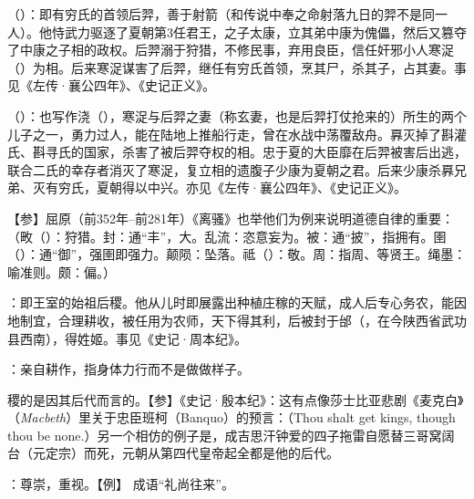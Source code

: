 {
\item {}（）：即有穷氏的首领后羿，善于射箭（和传说中奉之命射落九日的羿不是同一人）。他恃武力驱逐了夏朝第3任君王，之子太康，立其弟中康为傀儡，然后又篡夺了中康之子相的政权。后羿溺于狩猎，不修民事，弃用良臣，信任奸邪小人寒浞（）为相。后来寒浞谋害了后羿，继任有穷氏首领，烹其尸，杀其子，占其妻。事见《左传·襄公四年》、《史记正义》。
\item {}（）：也写作浇（），寒浞与后羿之妻（称玄妻，也是后羿打仗抢来的）所生的两个儿子之一，勇力过人，能在陆地上推船行走，曾在水战中荡覆敌舟。奡灭掉了斟灌氏、斟寻氏的国家，杀害了被后羿夺权的相。忠于夏的大臣靡在后羿被害后出逃，联合二氏的幸存者消灭了寒浞，复立相的遗腹子少康为夏朝之君。后来少康杀奡兄弟、灭有穷氏，夏朝得以中兴。亦见《左传·襄公四年》、《史记正义》。

【参】屈原（前352年--前281年）《离骚》也举他们为例来说明道德自律的重要：（畋（）：狩猎。封：通“丰”，大。乱流：恣意妄为。被：通“披”，指拥有。圉（）：通“御”，强圉即强力。颠陨：坠落。祗（）：敬。周：指周、等贤王。绳墨：喻准则。颇：偏。）

\item {}：即王室的始祖后稷。他从儿时即展露出种植庄稼的天赋，成人后专心务农，能因地制宜，合理耕收，被任用为农师，天下得其利，后被封于邰（，在今陕西省武功县西南），得姓姬。事见《史记·周本纪》。
\item {}：亲自耕作，指身体力行而不是做做样子。
\item 稷的是因其后代而言的。【参】《史记·殷本纪》：这有点像莎士比亚悲剧《麦克白》（\emph{Macbeth}）里关于忠臣班柯（Banquo）的预言：（Thou shalt get kings, though thou be none.）另一个相仿的例子是，成吉思汗钟爱的四子拖雷自愿替三哥窝阔台（元定宗）而死，元朝从第四代皇帝起全都是他的后代。
\item {}：尊崇，重视。【例】 成语“礼尚往来”。
}
{}


